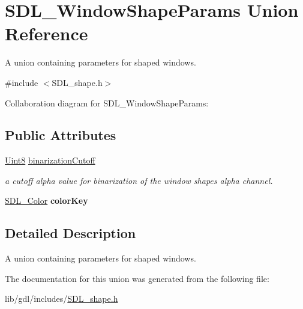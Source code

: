 \hypertarget{union_s_d_l___window_shape_params}{}\section{S\+D\+L\+\_\+\+Window\+Shape\+Params Union Reference}
\label{union_s_d_l___window_shape_params}


A union containing parameters for shaped windows.  




{\ttfamily \#include $<$S\+D\+L\+\_\+shape.\+h$>$}



Collaboration diagram for S\+D\+L\+\_\+\+Window\+Shape\+Params\+:
\subsection*{Public Attributes}
\begin{DoxyCompactItemize}
\item 
\hypertarget{union_s_d_l___window_shape_params_a534c40b09588a8075c0a70227753dc56}{}\hyperlink{_s_d_l__stdinc_8h_a2944638813a090aa23e62f4da842c3e2}{Uint8} \hyperlink{union_s_d_l___window_shape_params_a534c40b09588a8075c0a70227753dc56}{binarization\+Cutoff}\label{union_s_d_l___window_shape_params_a534c40b09588a8075c0a70227753dc56}

\begin{DoxyCompactList}\small\item\em a cutoff alpha value for binarization of the window shape\textquotesingle{}s alpha channel. \end{DoxyCompactList}\item 
\hypertarget{union_s_d_l___window_shape_params_a8bf3e442a51a1bbf452cfec7c1ed5318}{}\hyperlink{struct_s_d_l___color}{S\+D\+L\+\_\+\+Color} {\bfseries color\+Key}\label{union_s_d_l___window_shape_params_a8bf3e442a51a1bbf452cfec7c1ed5318}

\end{DoxyCompactItemize}


\subsection{Detailed Description}
A union containing parameters for shaped windows. 

The documentation for this union was generated from the following file\+:\begin{DoxyCompactItemize}
\item 
lib/gdl/includes/\hyperlink{_s_d_l__shape_8h}{S\+D\+L\+\_\+shape.\+h}\end{DoxyCompactItemize}
